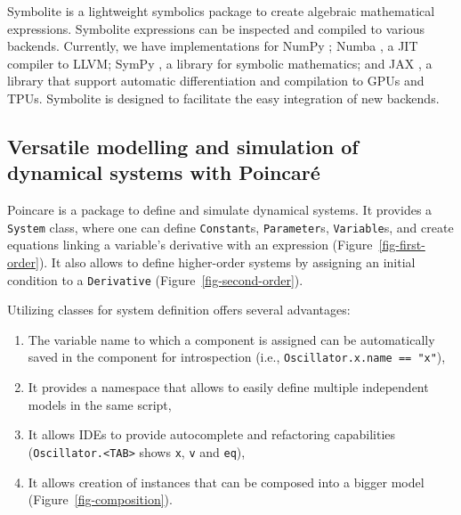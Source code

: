 \documentclass[
  letterpaper,
  DIV=11,
  numbers=noendperiod]{scrartcl}
\providecommand{\tightlist}{%
  \setlength{\itemsep}{0pt}\setlength{\parskip}{0pt}}\usepackage{longtable,booktabs,array}
\begin{document}
Symbolite is a lightweight symbolics package to create algebraic
mathematical expressions. Symbolite expressions can be inspected and
compiled to various backends. Currently, we have implementations for
NumPy \cite{harrisArrayProgrammingNumPy2020}; Numba \cite{lamNumbaLLVMbasedPython2015},
a \ac{JIT} compiler to LLVM; SymPy \cite{meurerSymPySymbolicComputing2017}, a
library for symbolic mathematics; and JAX \cite{jax2018github}, a
library that support automatic differentiation and compilation to \acp{GPU}
and \acp{TPU}. Symbolite is designed to facilitate the easy integration of
new backends.

\hypertarget{versatile-modelling-and-simulation-of-dynamical-systems-with-poincaruxe9}{%
\subsection{Versatile modelling and simulation of dynamical systems with
Poincaré}\label{versatile-modelling-and-simulation-of-dynamical-systems-with-poincaruxe9}}



Poincare is a package to define and simulate dynamical systems. It
provides a \texttt{System} class, where one can define
\texttt{Constant}s, \texttt{Parameter}s, \texttt{Variable}s, and create
equations linking a variable's derivative with an expression
(Figure~\ref{fig-first-order}). It also allows to define higher-order
systems by assigning an initial condition to a \texttt{Derivative}
(Figure~\ref{fig-second-order}).

Utilizing classes for system definition offers several advantages:

\begin{enumerate}
\def\labelenumi{\arabic{enumi}.}
\tightlist
\item
  The variable name to which a component is assigned can be
  automatically saved in the component for introspection (i.e.,
  \texttt{Oscillator.x.name\ ==\ "x"}),
\item
  It provides a namespace that allows to easily define multiple
  independent models in the same script,
\item
  It allows \acp{IDE} to provide autocomplete and refactoring capabilities
  (\texttt{Oscillator.\textless{}TAB\textgreater{}} shows \texttt{x},
  \texttt{v} and \texttt{eq}),
\item
  It allows creation of instances that can be composed into a bigger
  model (Figure~\ref{fig-composition}).
\end{enumerate}
\end{document}
